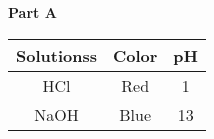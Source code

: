 \clearpage %
\appendix
\appendixpage
\addappheadtotoc
{}
\textbf{Part A} 
\begin{center}
\begin{tabular}{c c c}
    \toprule
    Solutionss & Color & pH \\
    \midrule
    HCl & Red & 1 \\
    NaOH & Blue & 13 \\
    \bottomrule
\end{tabular}
\end{center}

%
